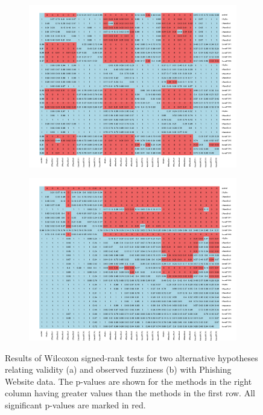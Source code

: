 \documentclass[main]{subfiles}
\begin{document}
\begin{figure}[h]
\centering
\begin{subfigure}{.5\textwidth}
  \centering
  \includegraphics[width=\linewidth]{images/heatmapPhish}
\end{subfigure}%
\begin{subfigure}{.5\textwidth}
  \centering
  \includegraphics[width=\linewidth]{images/heatmapPhish_eff}
\end{subfigure}%
\caption{Results of Wilcoxon signed-rank tests for two alternative hypotheses relating validity (a) and observed fuzziness (b) with Phishing Website data. The p-values are shown for the methods in the right column having greater values than the methods in the first row. All significant p-values are marked in red.} \label{fig:testPhish}
\end{figure}
\end{document}
